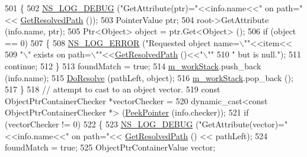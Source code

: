 \begin{DoxyCode}
501                 \{
502                   \hyperlink{group__logging_ga413f1886406d49f59a6a0a89b77b4d0a}{NS\_LOG\_DEBUG} (\textcolor{stringliteral}{"GetAttribute(ptr)="}<<info.name<<\textcolor{stringliteral}{" on path="}<<
      \hyperlink{classns3_1_1Resolver_a0788cf21229e40fba6219ec44b9148bb}{GetResolvedPath} ());
503                   PointerValue ptr;
504                   root->GetAttribute (info.name, ptr);
505                   Ptr<Object> \textcolor{keywordtype}{object} = ptr.Get<Object> ();
506                   \textcolor{keywordflow}{if} (\textcolor{keywordtype}{object} == 0)
507                     \{
508                       \hyperlink{group__logging_ga0261a8db1d4ac5f79417d117634fd455}{NS\_LOG\_ERROR} (\textcolor{stringliteral}{"Requested object name=\(\backslash\)""}<<item<<
509                                     \textcolor{stringliteral}{"\(\backslash\)" exists on path=\(\backslash\)""}<<\hyperlink{classns3_1_1Resolver_a0788cf21229e40fba6219ec44b9148bb}{GetResolvedPath} ()<<\textcolor{stringliteral}{"\(\backslash\)""}
510                                     \textcolor{stringliteral}{" but is null."});
511                       \textcolor{keywordflow}{continue};
512                     \}
513                   foundMatch = \textcolor{keyword}{true};
514                   \hyperlink{classns3_1_1Resolver_a7b3477fa2e0e29524a56740f1d13fe96}{m\_workStack}.push\_back (info.name);
515                   \hyperlink{classns3_1_1Resolver_ae91ec5c188ee8da874e4915193efb000}{DoResolve} (pathLeft, \textcolor{keywordtype}{object});
516                   \hyperlink{classns3_1_1Resolver_a7b3477fa2e0e29524a56740f1d13fe96}{m\_workStack}.pop\_back ();
517                 \}
518               \textcolor{comment}{// attempt to cast to an object vector.}
519               \textcolor{keyword}{const} ObjectPtrContainerChecker *vectorChecker = 
520                 \textcolor{keyword}{dynamic\_cast<}\textcolor{keyword}{const }ObjectPtrContainerChecker *\textcolor{keyword}{>} (\hyperlink{namespacens3_af2a7557fe9afdd98d8f6f8f6e412cf5a}{PeekPointer} (info.checker));
521               \textcolor{keywordflow}{if} (vectorChecker != 0)
522                 \{
523                   \hyperlink{group__logging_ga413f1886406d49f59a6a0a89b77b4d0a}{NS\_LOG\_DEBUG} (\textcolor{stringliteral}{"GetAttribute(vector)="}<<info.name<<\textcolor{stringliteral}{" on path="}<<
      \hyperlink{classns3_1_1Resolver_a0788cf21229e40fba6219ec44b9148bb}{GetResolvedPath} () << pathLeft);
524                   foundMatch = \textcolor{keyword}{true};
525                   ObjectPtrContainerValue vector;

\end{DoxyCode}
